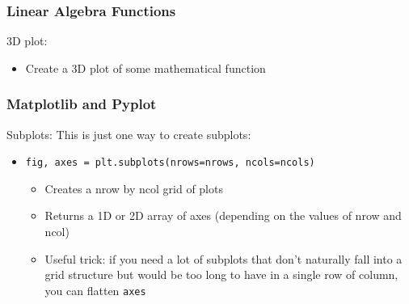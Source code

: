 \documentclass{beamer}
\newcommand{\code}[1]{\texttt{#1}}
\begin{document}
\begin{frame}	
	\frametitle{Linear Algebra Functions}
	
	\begin{exampleblock}{3D plot:}
		\begin{itemize}
			\item Create a 3D plot of some mathematical function
		\end{itemize}
	\end{exampleblock}
	
\end{frame}

\begin{frame}	
	\frametitle{Matplotlib and Pyplot}
	
	\begin{block}{Subplots:}
		This is just one way to create subplots:
		\begin{itemize}
		    
		    \item \code{fig, axes = plt.subplots(nrows=nrows, ncols=ncols)}
		        \begin{itemize}
		            
		            \item Creates a nrow by ncol grid of plots
		            \item Returns a 1D or 2D array of axes (depending on the values of nrow and ncol)
		            \item Useful trick: if you need a lot of subplots that don't naturally fall into a grid structure but would be too long to have in a single row of column, you can flatten \code{axes}
		        \end{itemize}
		\end{itemize}
	\end{block}
	
\end{frame}
\end{document}
